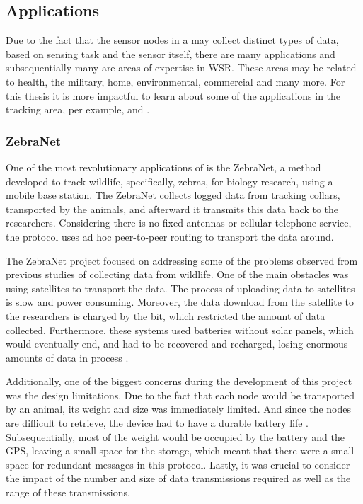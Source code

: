 
\subsection{Applications}
\label{subsec:wsn_applications}
Due to the fact that the sensor nodes in a  may collect distinct types of
data, based on sensing task and the sensor itself, there are many applications and
subsequentially many are areas of expertise in WSR. These areas may be related to health, the
military, home, environmental, commercial and many more. For this thesis it is more impactful
to learn about some of the applications in the tracking area, per example, 
and .

\subsubsection{ZebraNet}
\label{subsubsection:zebranet}
One of the most revolutionary applications of  is the ZebraNet, a method
developed to track wildlife, specifically, zebras, for biology research, using a mobile base
station. The ZebraNet collects logged data from tracking collars, transported by the
animals, and afterward it transmits this data back to the researchers. Considering there
is no fixed antennas or cellular telephone service, the protocol uses ad hoc
peer-to-peer routing to transport the data around.

The ZebraNet project focused on addressing some of the problems observed from previous
studies of collecting data from wildlife. One of the main obstacles was using
satellites to transport the data. The process of uploading data to satellites is slow and
power consuming. Moreover, the data download from the satellite to the researchers is
charged by the bit, which restricted the amount of data collected. Furthermore, these
systems used batteries without solar panels, which would eventually end, and had to be
recovered and recharged, losing enormous amounts of data in process \cite{Juang2002}.

Additionally, one of the biggest concerns during the development of this project was the
design limitations. Due to the fact that each node would be transported by an animal,
its weight and size was immediately limited. And since the nodes are difficult to
retrieve, the device had to have a durable battery life \cite{Zhang2004}. Subsequentially,
most of the weight would be occupied by the battery and the GPS, leaving a small
space for the storage, which meant that there were a small space for redundant messages in
this protocol. Lastly, it was crucial to consider the impact of the number and size of data
transmissions required as well as the range of these transmissions.

